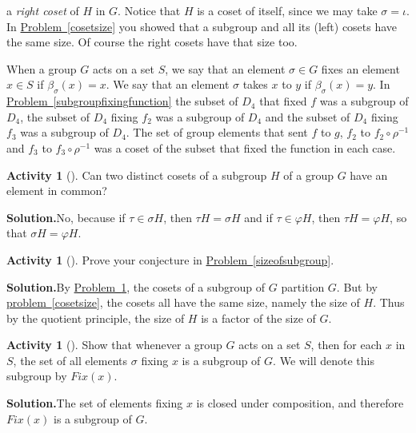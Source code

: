 \documentclass[10pt,]{book}
\theoremstyle{plain}
\theoremstyle{definition}
\newtheorem{activity}[project]{Activity}
\numberwithin{equation}{chapter}
\begin{document}
a \emph{right coset} of \(H\) in \(G\). Notice that \(H\) is a coset of itself, since we may take \(\sigma=\iota\). In \hyperref[cosetsize]{Problem~\ref{cosetsize}} you showed that a subgroup and all its (left) cosets have the same size. Of course the right cosets have that size too.%
\par
When a group \(G\) acts on a set \(S\), we say that an element \(\sigma \in
G\) fixes an element \(x\in S\) if \(\beta_{\sigma}(x) = x\). We say that an element \(\sigma\) takes \(x\) to \(y\) if \(\beta_{\sigma}(x) =y\). In \hyperref[subgroupfixingfunction]{Problem~\ref{subgroupfixingfunction}} the subset of \(D_4\) that fixed \(f\) was a subgroup of \(D_4\), the subset of \(D_4\) fixing \(f_2\) was a subgroup of \(D_4\) and the subset of \(D_4\) fixing \(f_3\) was a subgroup of \(D_4\). The set of group elements that sent \(f\) to \(g\), \(f_2\) to \(f_2\circ\rho^{-1}\) and \(f_3\) to \(f_3\circ\rho^{-1}\) was a coset of the subset that fixed the function in each case.%
\begin{activity}[]\label{cosetspartitionG}
Can two distinct cosets of a subgroup \(H\) of a group \(G\) have an element in common?%
\par\medskip\noindent%
\textbf{Solution.}\quad No, because if \(\tau\in \sigma H\), then \(\tau H =\sigma H\) and if \(\tau \in \varphi H\), then \(\tau H = \varphi H\), so that \(\sigma
H=\varphi H\).%
\end{activity}
\begin{activity}[]\label{activity-299}
Prove your conjecture in \hyperref[sizeofsubgroup]{Problem~\ref{sizeofsubgroup}}.%
\par\medskip\noindent%
\textbf{Solution.}\quad By \hyperref[cosetspartitionG]{Problem~\ref{cosetspartitionG}}, the cosets of a subgroup of \(G\) partition \(G\). But by \hyperref[cosetsize]{problem~\ref{cosetsize}}, the cosets all have the same size, namely the size of \(H\). Thus by the quotient principle, the size of \(H\) is a factor of the size of \(G\).%
\end{activity}
\begin{activity}[]\label{activity-300}
Show that whenever a group \(G\) acts on a set \(S\), then for each \(x\) in \(S\), the set of all elements \(\sigma\) fixing \(x\) is a subgroup of \(G\). We will denote this subgroup by \({ Fix}(x)\).%
\par\medskip\noindent%
\textbf{Solution.}\quad The set of elements fixing \(x\) is closed under composition, and therefore \({ Fix}(x)\) is a subgroup of \(G\).%
\end{activity}
\end{document}
